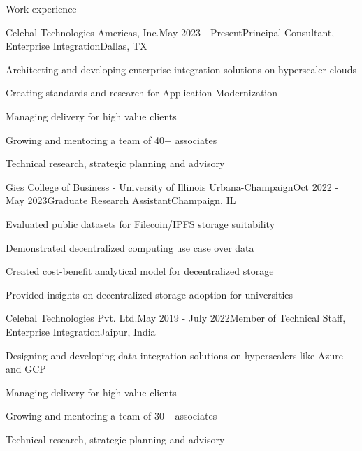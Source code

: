 \documentclass{resume} %
\begin{document}
    \begin{rSection}{Work experience}
        
        \begin{rSubsection}{Celebal Technologies Americas, Inc.}{May 2023 - Present}{Principal Consultant, Enterprise Integration}{Dallas, TX}
            \item Architecting and developing enterprise integration solutions on hyperscaler clouds
            \item Creating standards and research for Application Modernization
            \item Managing delivery for high value clients
            \item Growing and mentoring a team of 40+ associates
            \item Technical research, strategic planning and advisory
        \end{rSubsection}

        \begin{rSubsection}{Gies College of Business - University of Illinois Urbana-Champaign}{Oct 2022 - May 2023}{Graduate Research Assistant}{Champaign, IL}
                \item Evaluated public datasets for Filecoin/IPFS storage suitability
                \item Demonstrated decentralized computing use case over data
                \item Created cost-benefit analytical model for decentralized storage
                \item Provided insights on decentralized storage adoption for universities
        \end{rSubsection}

        \begin{rSubsection}{Celebal Technologies Pvt. Ltd.}{May 2019 - July 2022}{Member of Technical Staff, Enterprise Integration}{Jaipur, India}
            \item Designing and developing data integration solutions on hyperscalers like Azure and GCP
            \item Managing delivery for high value clients
            \item Growing and mentoring a team of 30+ associates
            \item Technical research, strategic planning and advisory
        \end{rSubsection}
        
        
    \end{rSection}
    
\end{document}
